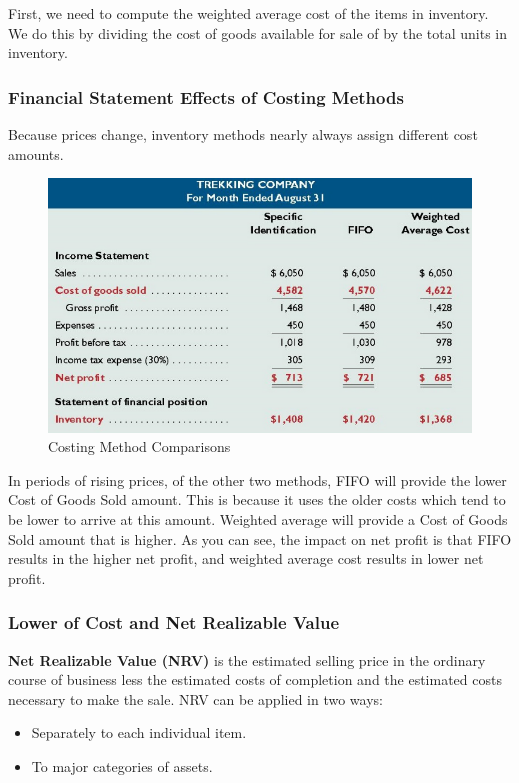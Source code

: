 \documentclass[../main.tex]{subfiles}
\begin{document}
	First, we need to compute the weighted average cost of the items in 
	inventory. We do this by dividing the cost of goods available for sale of 
	by the total units in inventory.
	
	\subsubsection{Financial Statement Effects of Costing Methods}
	
	Because prices change, inventory methods nearly always assign different 
	cost amounts. 
	
	\begin{figure}[ht]
		\centering
		\includegraphics[width=\columnwidth]{images/c7/costing_comparison.png}
		\caption{Costing Method Comparisons}
	\end{figure}
	
	In periods of rising prices, of the other two methods, FIFO will provide 
	the lower Cost of Goods Sold amount. This is because it uses the older 
	costs which tend to be lower to arrive at this amount. Weighted average 
	will provide a Cost of Goods Sold amount that is higher. As you can see, 
	the impact on net profit is that FIFO results in the higher net profit, and 
	weighted average cost results in lower net profit.  
	
	\subsubsection{Lower of Cost and Net Realizable Value}
	
	\textbf{Net Realizable Value (NRV)} is the estimated selling price in the 
	ordinary course of business less the estimated costs of completion and the 
	estimated costs necessary to make the sale. NRV can be applied in two ways:
	\begin{itemize}[noitemsep]
		\item Separately to each individual item.
		\item To major categories of assets. 
	\end{itemize}
	
\end{document}
